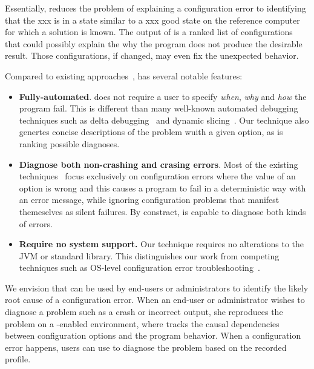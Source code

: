 Essentially, \ourtool reduces the problem of explaining a
configuration error to
identifying that the xxx is in a state similar to a xxx good state
on the reference computer for which a solution is known.
The output of \ourtool is a ranked list of
configurations that could possibly explain the why the program does not produce the desirable result. Those
configurations, if changed, may even fix the unexpected behavior.


Compared to existing approaches~\cite{Zeller:2002:ICC, Zhang:2003:PDS,
Rabkin:2011:PPC, Whitaker:2004:CDS, Attariyan:2010:ACT, Wang:2004:AMT}, \ourtool has
several notable features:

\begin{itemize}
\item \textbf{Fully-automated}.
\ourtool does not require a user to specify
\textit{when}, \textit{why} and \textit{how} the program fail. This is
different than many well-known automated debugging techniques such
as delta debugging~\cite{Zeller:2002:ICC} and dynamic slicing~\cite{Zhang:2003:PDS}.
Our technique also genertes concise descriptions of the problem
wuith a given option, as is ranking possible diagnoses.

\item \textbf{Diagnose both non-crashing and crasing errors}.
Most of the existing techniques~\cite{Rabkin:2011:PPC,
Whitaker:2004:CDS, Attariyan:2010:ACT} focus exclusively on configuration errors
where the value of an option is wrong and this causes a program
to fail in a deterministic way with an error message, while
ignoring configuration problems that manifest themeselves as
silent failures. By constract, \ourtool is capable to diagnose
both kinds of errors.

\item \textbf{Require no system support.} Our technique requires no alterations to
the JVM or standard library. This distinguishes our work from
competing techniques such as OS-level configuration
error troubleshooting~\cite{Whitaker:2004:CDS}.%

\end{itemize}


We envision that \ourtool can be used by end-users or
administrators to identify the likely root cause of a configuration error.
When an end-user or administrator wishes to diagnose a
problem such as a crash or incorrect output, she
reproduces the problem on a \ourtool-enabled environment,
where \ourtool tracks the causal dependencies between
configuration options and the program behavior. 
When a configuration error happens, users can
use \ourtool to diagnose the problem based on the recorded profile.

